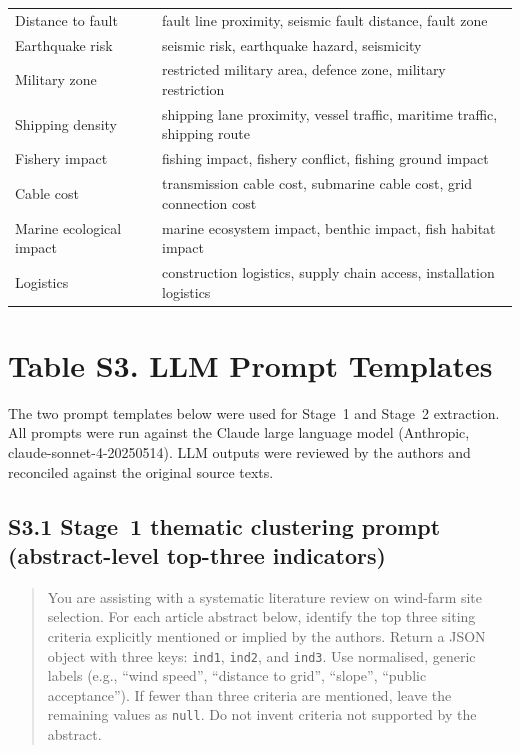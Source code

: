 \documentclass[12pt,a4paper]{article}
\begin{document}
\begin{table}[htbp]
\begin{tabular}{p{4.2cm}p{8.5cm}}
Distance to fault & fault line proximity, seismic fault distance, fault zone \\
Earthquake risk & seismic risk, earthquake hazard, seismicity \\
Military zone & restricted military area, defence zone, military restriction \\
Shipping density & shipping lane proximity, vessel traffic, maritime traffic, shipping route \\
Fishery impact & fishing impact, fishery conflict, fishing ground impact \\
Cable cost & transmission cable cost, submarine cable cost, grid connection cost \\
Marine ecological impact & marine ecosystem impact, benthic impact, fish habitat impact \\
Logistics & construction logistics, supply chain access, installation logistics \\
\bottomrule
\end{tabular}
\end{table}

\newpage
\section*{Table S3. LLM Prompt Templates}

The two prompt templates below were used for Stage~1 and Stage~2 extraction. All prompts were run against the Claude large language model (Anthropic, claude-sonnet-4-20250514). LLM outputs were reviewed by the authors and reconciled against the original source texts.

\subsection*{S3.1 Stage~1 thematic clustering prompt (abstract-level top-three indicators)}

\begin{quote}
\small
You are assisting with a systematic literature review on wind-farm site selection. For each article abstract below, identify the top three siting criteria explicitly mentioned or implied by the authors. Return a JSON object with three keys: \texttt{ind1}, \texttt{ind2}, and \texttt{ind3}. Use normalised, generic labels (e.g., ``wind speed'', ``distance to grid'', ``slope'', ``public acceptance''). If fewer than three criteria are mentioned, leave the remaining values as \texttt{null}. Do not invent criteria not supported by the abstract.
\end{quote}
\end{document}
